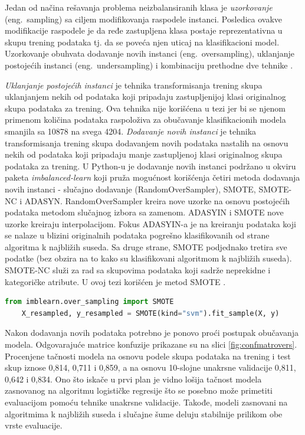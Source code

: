 \documentclass[12pt,oneside]{memoir}
\begin{document}
Jedan od načina rešavanja problema neizbalansiranih klasa je \textit{uzorkovanje} (eng.~sampling) sa ciljem modifikovanja raspodele instanci. Posledica ovakve modifikacije raspodele je da ređe zastupljena klasa postaje reprezentativna u skupu trening podataka tj. da se poveća njen uticaj na klasifikacioni model. Uzorkovanje obuhvata dodavanje novih instanci (eng.~oversampling), uklanjanje postojećih instanci (eng.~undersampling) i kombinaciju prethodne dve tehnike \cite{mitic, aggarwal}. 

\textit{Uklanjanje postojećih instanci} je tehnika transformisanja trening skupa uklanjanjem nekih od podataka koji pripadaju zastupljenijoj klasi originalnog skupa podataka za trening. Ova tehnika nije korišćena u tezi jer bi se njenom primenom količina podataka raspoloživa za obučavanje klasifikacionih modela smanjila sa 10878 na svega 4204.
\textit{Dodavanje novih instanci} je tehnika transformisanja trening skupa dodavanjem novih podataka nastalih na osnovu nekih od podataka koji pripadaju manje zastupljenoj klasi originalnog skupa podataka za trening. U Python-u je dodavanje novih instanci podržano u okviru paketa \textit{imbalanced-learn} koji pruža mogućnost korišćenja četiri metoda dodavanja novih instanci - slučajno dodavanje (RandomOverSampler), SMOTE, SMOTE-NC i ADASYN. RandomOverSampler kreira nove uzorke na osnovu postojećih podataka metodom slučajnog izbora sa zamenom. ADASYIN i SMOTE nove uzorke kreiraju interpolacijom. Fokus ADASYIN-a je na kreiranju podataka koji se nalaze u blizini originalnih podataka pogrešno klasifikovanih od strane algoritma k najbližih suseda. Sa druge strane, SMOTE podjednako tretira sve podatke (bez obzira na to kako su klasifikovani algoritmom k najbližih suseda). SMOTE-NC služi za rad sa skupovima podataka koji sadrže neprekidne i kategoričke atribute. U ovoj tezi korišćen je metod SMOTE \cite{imblearn, mitic}.

\begin{lstlisting}[language=Python, basicstyle=\tiny]
	from imblearn.over_sampling import SMOTE
	X_resampled, y_resampled = SMOTE(kind="svm").fit_sample(X, y)
\end{lstlisting}

Nakon dodavanja novih podataka potrebno je ponovo proći postupak obučavanja modela. Odgovarajuće matrice konfuzije prikazane su na slici \ref{fig:confmatrovers}. Procenjene tačnosti modela na osnovu podele skupa podataka na trening i test skup iznose 0,814, 0,711 i 0,859, a na osnovu 10-slojne unakrsne validacije 0,811, 0,642 i 0,834. Ono što iskače u prvi plan je vidno lošija tačnost modela zasnovanog na algoritmu logističke regresije što se posebno može primetiti evaluacijom pomoću tehnike unakrsne validacije. Takođe, modeli zasnovani na algoritmima k najbližih suseda i slučajne šume deluju stabilnije prilikom obe vrste evaluacije. 
\end{document}
